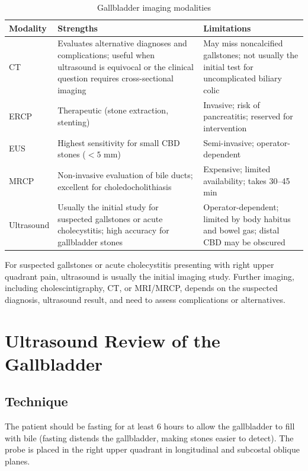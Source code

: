\begin{table}[h]
\centering
\caption{Gallbladder imaging modalities}
\begin{tabular}{p{3cm} p{4cm} p{4cm}}
\hline
\textbf{Modality} & \textbf{Strengths} & \textbf{Limitations} \\
\hline
CT & Evaluates alternative diagnoses and complications; useful when ultrasound is equivocal or the clinical question requires cross-sectional imaging & May miss noncalcified gallstones; not usually the initial test for uncomplicated biliary colic \\
ERCP & Therapeutic (stone extraction, stenting) & Invasive; risk of pancreatitis; reserved for intervention \\
EUS & Highest sensitivity for small CBD stones ($< 5$ mm) & Semi-invasive; operator-dependent \\
MRCP & Non-invasive evaluation of bile ducts; excellent for choledocholithiasis & Expensive; limited availability; takes 30--45 min \\
Ultrasound & Usually the initial study for suspected gallstones or acute cholecystitis; high accuracy for gallbladder stones & Operator-dependent; limited by body habitus and bowel gas; distal CBD may be obscured \\
\hline
\end{tabular}
\end{table}

\begin{pearlbox}
For suspected gallstones or acute cholecystitis presenting with right upper quadrant pain, ultrasound is usually the initial imaging study. Further imaging, including cholescintigraphy, CT, or MRI/MRCP, depends on the suspected diagnosis, ultrasound result, and need to assess complications or alternatives.
\end{pearlbox}


\section{Ultrasound Review of the Gallbladder}

\subsection{Technique}
The patient should be fasting for at least 6 hours to allow the gallbladder to fill with bile (fasting distends the gallbladder, making stones easier to detect). The probe is placed in the right upper quadrant in longitudinal and subcostal oblique planes.

